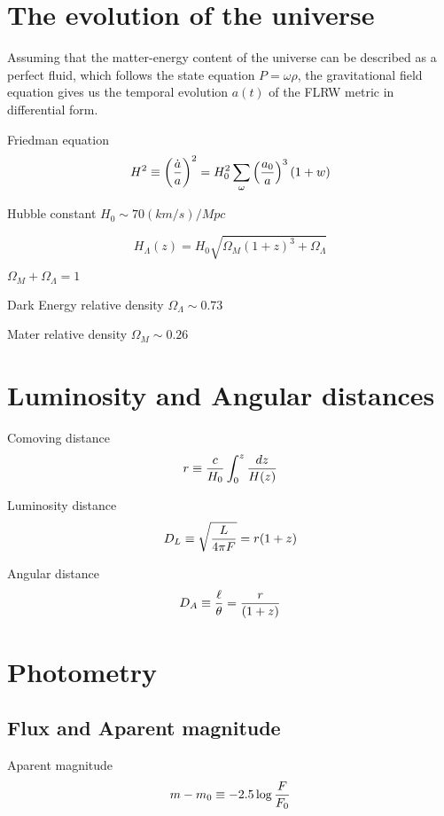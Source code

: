 \section{The evolution of the universe}

Assuming that the matter-energy content of the universe can be described as a perfect fluid, which follows the state equation $P = \omega \rho$, the gravitational field equation gives us the temporal evolution $a(t)$ of the FLRW metric in differential form.

Friedman equation
\begin{equation}
H^2 \equiv \left({\dot{a} \over a}\right)^2 = H_0^2\sum_\omega \left({a_0 \over a}\right)^3(1+w)
\end{equation} 

Hubble constant $H_0 \sim 70 (km/s)/Mpc $

\begin{equation}
H_\Lambda(z) = H_0 \sqrt{\Omega_M(1+z)^3 + \Omega_\Lambda}
\end{equation}

$\Omega_M + \Omega_\Lambda = 1$

Dark Energy relative density $\Omega_\Lambda \sim 0.73$

Mater relative density $\Omega_M \sim 0.26$

\section{Luminosity and Angular distances}

Comoving distance 
\begin{equation}
r \equiv {c \over H_0}\int_0^{z} {dz \over H(z)}
\end{equation}

Luminosity distance 
\begin{equation}
D_L \equiv \sqrt{L \over 4 \pi F}  = r (1+z)
\end{equation}

Angular distance 
\begin{equation}
D_A \equiv {\ell \over \theta} = {r \over (1+z)}
\end{equation}

\section{Photometry}

\subsection{Flux and Aparent magnitude}
Aparent magnitude
\begin{equation}
m - m_0 \equiv -2.5\log{F \over F_0}
\end{equation}

